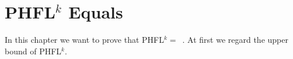 \chapter{PHFL$^k$ Equals }
\label{ch:phfl_k_equals_k_exptime}
In this chapter we want to prove that PHFL$^k =$~. At first we regard the upper bound of PHFL$^k$.



